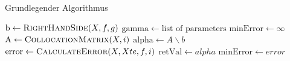 \begin{algorithm}
\caption{Grundlegender Algorithmus}
\label{alg:Grund}
\begin{algorithmic}[1]

\State $\mathrm{b} \gets \Call{RightHandSide}{X,f,g}$
\State $\mathrm{gamma} \gets \text{list of parameters}$
\State $\mathrm{minError} \gets \infty$
	\State $\mathrm{A} \gets \Call{CollocationMatrix}{X, i}$
	\State $\mathrm{alpha} \gets A\backslash b$
	\State $\mathrm{error} \gets \Call{CalculateError}{X, Xte, f, i}$
		\State $\mathrm{retVal} \gets alpha$
		\State $\mathrm{minError} \gets error$
	\EndIf
\EndFor
\State {}
\EndFunction
\end{algorithmic}
\end{algorithm}
